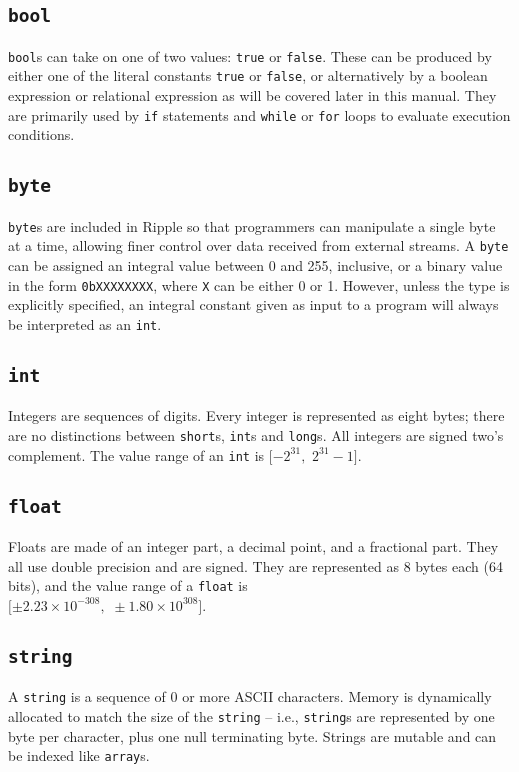 \documentclass{article}
\newcommand{\code}{\texttt}
\begin{document}
\subsection{\code{bool}}
\code{bool}s can take on one of two values: \code{true} or \code{false}. These can be produced by either one of the literal constants \code{true} or \code{false}, or alternatively by a boolean expression or relational expression as will be covered later in this manual. They are primarily used by \code{if} statements and \code{while} or \code{for} loops to evaluate execution conditions.

\subsection{\code{byte}}
\code{byte}s are included in Ripple so that programmers can manipulate a single byte at a time, allowing finer control over data received from external streams. A \code{byte} can be assigned an integral value between 0 and 255, inclusive, or a binary value in the form \code{0bXXXXXXXX}, where \code{X} can be either 0 or 1. However, unless the type is explicitly specified, an integral constant given as input to a program will always be interpreted as an \code{int}.

\subsection{\code{int}}
Integers are sequences of digits. Every integer is represented as eight bytes; there are no distinctions between \code{short}s, \code{int}s and \code{long}s. All integers are signed two's complement. The value range of an \code{int} is $\lbrack-2^{31},\,\, 2^{31} - 1\rbrack$.

\subsection{\code{float}}
Floats are made of an integer part, a decimal point, and a fractional part. They all use double precision and are signed. They are represented as 8 bytes each (64 bits), and the value range of a \code{float} is \\
$\lbrack \pm 2.23 \times 10^{-308},\,\,\pm 1.80 \times 10^{308}\rbrack$.


\subsection{\code{string}}
A \code{string} is a sequence of 0 or more ASCII characters. Memory is dynamically allocated to match the size of the \code{string} -- i.e., \code{string}s are represented by one byte per character, plus one null terminating byte. Strings are mutable and can be indexed like \code{array}s.
\end{document}
